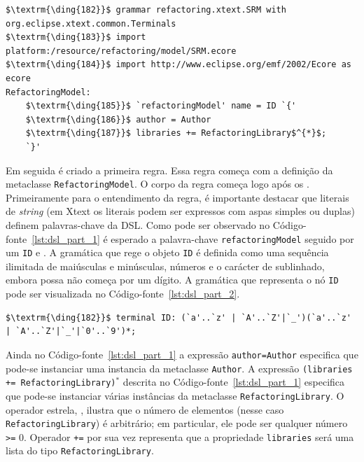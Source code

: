 \begin{lstlisting}[language=Xtext, frame=single, basicstyle={\scriptsize}, mathescape=true, label={lst:dsl_part_1}, caption={Gramática da DSL - parte 1}]
$\textrm{\ding{182}}$ grammar refactoring.xtext.SRM with org.eclipse.xtext.common.Terminals 
$\textrm{\ding{183}}$ import platform:/resource/refactoring/model/SRM.ecore
$\textrm{\ding{184}}$ import http://www.eclipse.org/emf/2002/Ecore as ecore
RefactoringModel: 
	$\textrm{\ding{185}}$ `refactoringModel' name = ID `{'
	$\textrm{\ding{186}}$ author = Author
	$\textrm{\ding{187}}$ libraries += RefactoringLibrary$^{*}$;
	`}'
\end{lstlisting}


Em seguida é criado a primeira regra. Essa regra começa com a definição da metaclasse \texttt{RefactoringModel}. O corpo da regra começa logo após os \aspas{\texttt{:}}. Primeiramente para o entendimento da regra, é importante destacar que literais de \textit{string} (em Xtext os literais podem ser expressos com aspas simples ou duplas) definem palavras-chave da DSL. Como pode ser observado no Código-fonte~\ref{lst:dsl_part_1} é esperado a palavra-chave \texttt{refactoringModel} seguido por um \texttt{ID} e \aspas{\{}. A gramática que rege o objeto \texttt{ID} é definida como uma sequência ilimitada de maiúsculas e minúsculas, números e o carácter de sublinhado, embora possa não começa por um dígito. A gramática que representa o nó \texttt{ID} pode ser visualizada no Código-fonte~\ref{lst:dsl_part_2}. 

\begin{lstlisting}[language=Xtext, frame=single, basicstyle=\scriptsize, mathescape=true, label={lst:dsl_part_2}, caption={Gramática da DSL - parte 2}]
	$\textrm{\ding{182}}$ terminal ID: (`a'..`z' | `A'..`Z'|`_')(`a'..`z' | `A'..`Z'|`_'|`0'..`9')*;
\end{lstlisting}

Ainda no Código-fonte~\ref{lst:dsl_part_1} a expressão \texttt{author=Author} especifica que pode-se instanciar uma instancia da metaclasse \texttt{Author}. A expressão \texttt{(libraries += RefactoringLibrary)$^{*}$} descrita no Código-fonte~\ref{lst:dsl_part_1} especifica que pode-se instanciar várias instâncias da metaclasse \texttt{RefactoringLibrary}. O operador estrela, \aspas{\texttt{*}}, ilustra que o número de elementos (nesse caso \texttt{RefactoringLibrary}) é arbitrário; em particular, ele pode ser qualquer número \texttt{>=} 0. Operador \texttt{+=} por sua vez representa que a propriedade \texttt{libraries} será uma lista do tipo \texttt{RefactoringLibrary}.


